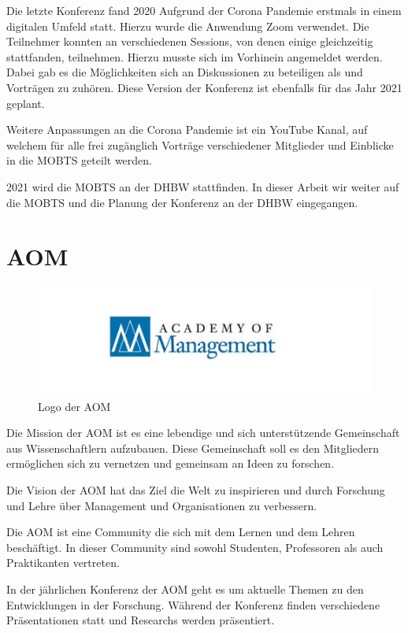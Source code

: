 Die letzte Konferenz fand 2020 Aufgrund der Corona Pandemie erstmals in einem digitalen Umfeld statt. Hierzu wurde die Anwendung Zoom verwendet. Die Teilnehmer konnten an verschiedenen Sessions, von denen einige gleichzeitig stattfanden, teilnehmen. Hierzu musste sich im Vorhinein angemeldet werden.\autocite{MOBTS.432021d}  Dabei gab es die Möglichkeiten sich an Diskussionen zu beteiligen als und Vorträgen zu zuhören. Diese Version der Konferenz ist ebenfalls für das Jahr 2021 geplant. 

Weitere Anpassungen an die Corona Pandemie ist ein YouTube Kanal, auf welchem für alle frei zugänglich Vorträge verschiedener Mitglieder und Einblicke in die \ac{MOBTS} geteilt werden.\autocite{MOBTS.432021} 

2021 wird die \ac{MOBTS} an der DHBW stattfinden. In dieser Arbeit wir weiter auf die \ac{MOBTS} und die Planung der Konferenz an der DHBW eingegangen.

\section{\ac{AOM}}
\begin{figure}[h]
    \centering
    \includegraphics[width=1.3\textwidth]{img/th.jpg}
    \caption[Logo: AOM]{Logo der \ac{AOM}}
    \label{fig:LOGO AOM}
\end{figure}
Die Mission der \ac{AOM} ist es eine lebendige und sich unterstützende Gemeinschaft aus Wissenschaftlern aufzubauen. Diese Gemeinschaft soll es den Mitgliedern ermöglichen sich zu vernetzen und gemeinsam an Ideen zu forschen.\autocite{AOM_CMS.432021b} 

Die Vision der \ac{AOM} hat das Ziel die Welt zu inspirieren und durch Forschung  und Lehre über Management und Organisationen zu verbessern. \autocite{AOM_CMS.432021b}

Die \ac{AOM} ist eine Community die sich mit dem Lernen und dem Lehren beschäftigt. In dieser Community sind sowohl Studenten, Professoren als auch Praktikanten vertreten.\autocite{AOM_CMS.432021d}

In der jährlichen Konferenz der \ac{AOM} geht es um aktuelle Themen zu den Entwicklungen in der Forschung. Während der Konferenz finden verschiedene Präsentationen statt und Researchs werden  präsentiert.\autocite{AOM_CMS.432021b} 

